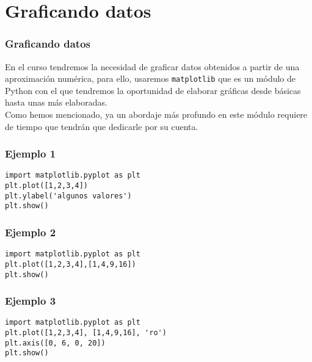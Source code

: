 \documentclass[12pt]{beamer}
\begin{document}
\section{Graficando datos}
\begin{frame}
\frametitle{Graficando datos}
En el curso tendremos la necesidad de graficar datos obtenidos a partir de una aproximaci\'{o}n num\'{e}rica, para ello, usaremos \texttt{matplotlib} que es un m\'{o}dulo de Python con el que tendremos la oportunidad de elaborar gr\'{a}ficas desde b\'{a}sicas hasta unas m\'{a}s elaboradas.
\\
\bigskip
Como hemos mencionado, ya un abordaje m\'{a}s profundo en este m\'{o}dulo requiere de tiempo que tendr\'{a}n que dedicarle por su cuenta.
\end{frame}
\begin{frame}[fragile]
\frametitle{Ejemplo 1}
\begin{lstlisting}
import matplotlib.pyplot as plt
plt.plot([1,2,3,4])
plt.ylabel('algunos valores')
plt.show()
\end{lstlisting}
\hspace{0.5cm}
\end{frame}
\begin{frame}[fragile]
\frametitle{Ejemplo 2}
\begin{lstlisting}
import matplotlib.pyplot as plt
plt.plot([1,2,3,4],[1,4,9,16])
plt.show()
\end{lstlisting}
\hspace{0.5cm}
\end{frame}
\begin{frame}[fragile]
\frametitle{Ejemplo 3}
\begin{lstlisting}
import matplotlib.pyplot as plt
plt.plot([1,2,3,4], [1,4,9,16], 'ro')
plt.axis([0, 6, 0, 20])
plt.show()
\end{lstlisting}
\hspace{0.5cm}
\end{frame}
\end{document}
